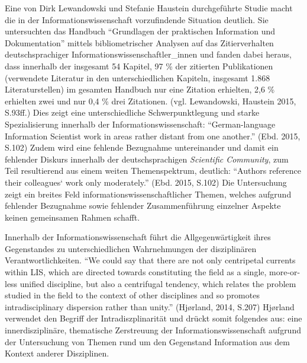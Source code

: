 \documentclass[a4paper,
fontsize=11pt,
oneside,
numbers=noperiodatend,
parskip=half-,
bibliography=totoc,
final
]{scrartcl}
\begin{document}
Eine von Dirk Lewandowski und Stefanie Haustein durchgeführte Studie
macht die in der Informationswissenschaft vorzufindende Situation
deutlich. Sie untersuchten das Handbuch \enquote{Grundlagen der
praktischen Information und Dokumentation} mittels bibliometrischer
Analysen auf das Zitierverhalten deutschsprachiger
Informationswissenschaftler\_innen und fanden dabei heraus, dass
innerhalb der insgesamt 54 Kapitel, 97 \% der zitierten Publikationen
(verwendete Literatur in den unterschiedlichen Kapiteln, insgesamt 1.868
Literaturstellen) im gesamten Handbuch nur eine Zitation erhielten, 2,6
\% erhielten zwei und nur 0,4 \% drei Zitationen. (vgl. Lewandowski,
Haustein 2015, S.93ff.) Dies zeigt eine unterschiedliche
Schwerpunktlegung und starke Spezialisierung innerhalb der
Informationswissenschaft: \enquote{German-language Information Scientist
work in areas rather distant from one another.} (Ebd. 2015, S.102) Zudem
wird eine fehlende Bezugnahme untereinander und damit ein fehlender
Diskurs innerhalb der deutschsprachigen \emph{Scientific Community}, zum
Teil resultierend aus einem weiten Themenspektrum, deutlich:
\enquote{Authors reference their colleagues` work only moderately.}
(Ebd. 2015, S.102) Die Untersuchung zeigt ein breites Feld
informationswissenschaftlicher Themen, welches aufgrund fehlender
Bezugnahme sowie fehlender Zusammenführung einzelner Aspekte keinen
gemeinsamen Rahmen schafft.

Innerhalb der Informationswissenschaft führt die Allgegenwärtigkeit
ihres Gegenstandes zu unterschiedlichen Wahrnehmungen der disziplinären
Verantwortlichkeiten. \enquote{We could say that there are not only
centripetal currents within LIS, which are directed towards constituting
the field as a single, more-or-less unified discipline, but also a
centrifugal tendency, which relates the problem studied in the field to
the context of other disciplines and so promotes intradisciplinary
dispersion rather than unity.} (Hjørland, 2014, S.207) Hjørland
verwendet den Begriff der Intradiszplinarität und drückt somit folgendes
aus: eine innerdisziplinäre, thematische Zerstreuung der
Informationswissenschaft aufgrund der Untersuchung von Themen rund um
den Gegenstand Information aus dem Kontext anderer Disziplinen.
\end{document}
